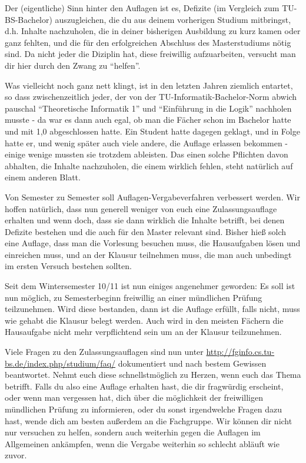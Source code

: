 \begin{multicols}{2}
Der (eigentliche) Sinn hinter den Auflagen ist es, Defizite (im Vergleich zum TU-BS-Bachelor) auszugleichen, die du aus deinem vorherigen Studium mitbringst, d.h. Inhalte nachzuholen, die in deiner bisherigen Ausbildung zu kurz kamen oder ganz fehlten, und die für den erfolgreichen Abschluss des Masterstudiums nötig sind. Da nicht jeder die Diziplin hat, diese freiwillig aufzuarbeiten, versucht man dir hier durch den Zwang zu "`helfen"'.

Was vielleicht noch ganz nett klingt, ist in den letzten Jahren ziemlich entartet, so dass zwischenzeitlich jeder, der von der TU-Informatik-Bachelor-Norm abwich pauschal "`Theoretische Informatik 1"' und "`Einführung in die Logik"' nachholen musste - da war es dann auch egal, ob man die Fächer schon im Bachelor hatte und mit 1,0 abgeschlossen hatte. Ein Student hatte dagegen geklagt, und in Folge hatte er, und wenig später auch viele andere, die Auflage erlassen bekommen - einige wenige mussten sie trotzdem ableisten. Das einen solche Pflichten davon abhalten, die Inhalte nachzuholen, die einem wirklich fehlen, steht natürlich auf einem anderen Blatt.

Von Semester zu Semester soll Auflagen-Vergabeverfahren verbessert werden. Wir hoffen natürlich, dass nun generell weniger von euch eine Zulassungsauflage erhalten und wenn doch, dass sie dann wirklich die Inhalte betrifft, bei denen Defizite bestehen und die auch für den Master relevant sind. Bisher hieß solch eine Auflage, dass man die Vorlesung besuchen muss, die Hausaufgaben lösen und einreichen muss, und an der Klausur teilnehmen muss, die man auch unbedingt im ersten Versuch bestehen sollten. 

Seit dem Wintersemester 10/11 ist nun einiges angenehmer geworden: Es soll ist nun möglich, zu Semesterbeginn freiwillig an einer mündlichen Prüfung teilzunehmen. Wird diese bestanden, dann ist die Auflage erfüllt, falls nicht, muss wie gehabt die Klausur belegt werden. Auch wird in den meisten Fächern die Hausaufgabe nicht mehr verpflichtend sein um an der Klausur teilzunehmen.

Viele Fragen zu den Zulassungsauflagen sind nun unter \url{http://fginfo.cs.tu-bs.de/index.php/studium/faq/} dokumentiert und nach bestem Gewissen beantwortet. Nehmt euch diese schnellstmöglich zu Herzen, wenn euch das Thema betrifft. Falls du also eine Auflage erhalten hast, die dir fragwürdig erscheint, oder wenn man vergessen hat, dich über die möglichkeit der freiwilligen mündlichen Prüfung zu informieren, oder du sonst irgendwelche Fragen dazu hast, wende dich am besten außerdem an die Fachgruppe. Wir können dir nicht nur versuchen zu helfen, sondern auch weiterhin gegen die Auflagen im Allgemeinen ankämpfen, wenn die Vergabe weiterhin so schlecht abläuft wie zuvor.


\end{multicols}
